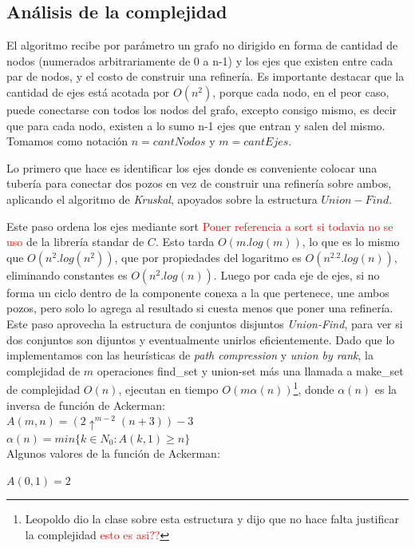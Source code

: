 \subsection{An\'alisis de la complejidad}
	El algoritmo recibe por par\'ametro un grafo no dirigido en forma de cantidad de nodos (numerados arbitrariamente de 0 a n-1) y los ejes que existen entre cada par de nodos, y el costo de construir una refiner\'ia. Es importante destacar que la cantidad de ejes est\'a acotada por $O(n^2)$, porque cada nodo, en el peor caso, puede conectarse con todos los nodos del grafo, excepto consigo mismo, es decir que para cada nodo, existen a lo sumo n-1 ejes que entran y salen del mismo. Tomamos como notaci\'on $n = cantNodos$ y $m = cantEjes$.
	
	Lo primero que hace es identificar los ejes donde es conveniente colocar una tuber\'ia para conectar dos pozos en vez de construir una refiner\'ia sobre ambos, aplicando el algoritmo de \textit{Kruskal}, apoyados sobre la estructura $Union-Find$.
	
	Este paso ordena los ejes mediante sort \textcolor{red}{Poner referencia a sort si todavia no se uso} de la librer\'ia standar de $C$. Esto tarda $O(m.log(m))$, lo que es lo mismo que $O(n^2.log(n^2))$, que por propiedades del logaritmo es $O(n^2.2.log(n))$, eliminando constantes es $O(n^2.log(n))$. Luego por cada eje de ejes, si no forma un ciclo dentro de la componente conexa a la que pertenece, une ambos pozos, pero solo lo agrega al resultado si cuesta menos que poner una refiner\'ia. Este paso aprovecha la estructura de conjuntos disjuntos \textit{Union-Find}, para ver si dos conjuntos son dijuntos y eventualmente unirlos eficientemente. Dado que lo implementamos con las heur\'isticas de \textit{path compression} y \textit{union by rank}, la complejidad de $m$ operaciones find_set y union-set m\'as una llamada a make_set de complejidad $O(n)$, ejecutan en tiempo $O(m\alpha(n))$\footnote{Leopoldo dio la clase sobre esta estructura y dijo que no hace falta justificar la complejidad \textcolor{red}{esto es asi??}}, donde $\alpha(n)$ es la inversa de funci\'on de Ackerman:\\

	$A(m,n) = (2\uparrow^{m-2}(n+3))-3$\\

	$\alpha(n) = min\{k \in N_0 : A(k,1) \geq n\}$\\

	Algunos valores de la funci\'on de Ackerman:

	$A(0,1) = 2$\\

